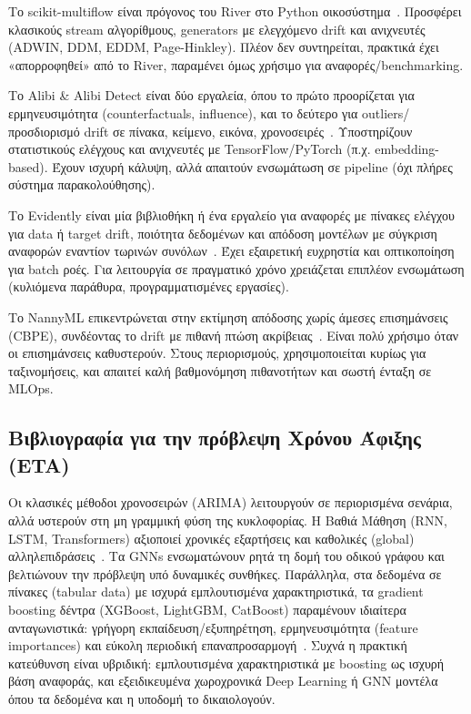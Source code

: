 Το scikit-multiflow είναι πρόγονος του River στο Python οικοσύστημα~\cite{montiel2018scikit}.
Προσφέρει κλασικούς stream αλγορίθμους, generators με ελεγχόμενο drift και ανιχνευτές (ADWIN, DDM, EDDM, Page-Hinkley).
Πλέον δεν συντηρείται, πρακτικά έχει «απορροφηθεί» από το River, παραμένει όμως χρήσιμο για αναφορές/benchmarking.

Το Alibi \& Alibi Detect είναι δύο εργαλεία, όπου το πρώτο προορίζεται για ερμηνευσιμότητα (counterfactuals, influence), και το δεύτερο για outliers/προσδιορισμό drift σε πίνακα, κείμενο, εικόνα, χρονοσειρές~\cite{looveren2020alibi}.
Υποστηρίζουν στατιστικούς ελέγχους και ανιχνευτές με TensorFlow/PyTorch (π.χ. embedding-based).
Έχουν ισχυρή κάλυψη, αλλά απαιτούν ενσωμάτωση σε pipeline (όχι πλήρες σύστημα παρακολούθησης).

Το Evidently είναι μία βιβλιοθήκη ή ένα εργαλείο για αναφορές με πίνακες ελέγχου για data ή target drift, ποιότητα δεδομένων και απόδοση μοντέλων με σύγκριση αναφορών εναντίον τωρινών συνόλων~\cite{evidentlyai2025}.
Έχει εξαιρετική ευχρηστία και οπτικοποίηση για batch ροές.
Για λειτουργία σε πραγματικό χρόνο χρειάζεται επιπλέον ενσωμάτωση (κυλιόμενα παράθυρα, προγραμματισμένες εργασίες).

Το NannyML επικεντρώνεται στην εκτίμηση απόδοσης χωρίς άμεσες επισημάνσεις (CBPE), συνδέοντας το drift με πιθανή πτώση ακρίβειας~\cite{grootendorst2023nannyml}.
Είναι πολύ χρήσιμο όταν οι επισημάνσεις καθυστερούν.
Στους περιορισμούς, χρησιμοποιείται κυρίως για ταξινομήσεις, και απαιτεί καλή βαθμονόμηση πιθανοτήτων και σωστή ένταξη σε MLOps.

\subsection*{Βιβλιογραφία για την πρόβλεψη Χρόνου Άφιξης (ETA)}
Οι κλασικές μέθοδοι χρονοσειρών (ARIMA) λειτουργούν σε περιορισμένα σενάρια, αλλά υστερούν στη μη γραμμική φύση της κυκλοφορίας.
Η Βαθιά Μάθηση (RNN, LSTM, Transformers) αξιοποιεί χρονικές εξαρτήσεις και καθολικές (global) αλληλεπιδράσεις~\cite{duan2016lstm, shen2019deeptte}.
Τα GNNs ενσωματώνουν ρητά τη δομή του οδικού γράφου και βελτιώνουν την πρόβλεψη υπό δυναμικές συνθήκες.
Παράλληλα, στα δεδομένα σε πίνακες (tabular data) με ισχυρά εμπλουτισμένα χαρακτηριστικά, τα gradient boosting δέντρα (XGBoost, LightGBM, CatBoost) παραμένουν ιδιαίτερα ανταγωνιστικά: γρήγορη εκπαίδευση/εξυπηρέτηση, ερμηνευσιμότητα (feature importances) και εύκολη περιοδική επαναπροσαρμογή~\cite{guin2006gbdt, zhang2015traveltimegbt}.
Συχνά η πρακτική κατεύθυνση είναι υβριδική: εμπλουτισμένα χαρακτηριστικά με boosting ως ισχυρή βάση αναφοράς, και εξειδικευμένα χωροχρονικά Deep Learning ή GNN μοντέλα όπου τα δεδομένα και η υποδομή το δικαιολογούν.

